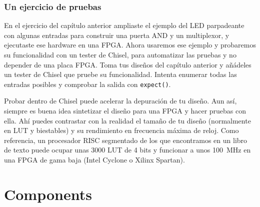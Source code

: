 \documentclass[%
    10pt,
    headinclude, footinclude=false,
    openright, %
    notitlepage,
    cleardoublepage=empty,
    headsepline,
    numbers=noenddot,
    bibliography=totoc, index=totoc,
    ]{scrbook}
\newcommand{\code}[1]{{\lstinline[basicstyle=\small\ttfamily]{#1}}}
\begin{document}
\subsection{Un ejercicio de pruebas}


En el ejercicio del capítulo anterior ampliaste el ejemplo del LED parpadeante con algunas entradas
para construir una puerta AND y un multiplexor, y ejecutaste ese hardware en una FPGA.
Ahora usaremos ese ejemplo y probaremos su funcionalidad con un tester de Chisel,
para automatizar las pruebas y no depender de una placa FPGA.
Toma tus diseños del capítulo anterior y añádeles un tester de Chisel que pruebe su funcionalidad.
Intenta enumerar todas las entradas posibles y comprobar la salida con \code{expect()}.


Probar dentro de Chisel puede acelerar la depuración de tu diseño.
Aun así, siempre es buena idea sintetizar el diseño para una FPGA y hacer pruebas
con ella. Ahí puedes contrastar con la realidad el tamaño de tu diseño (normalmente
en LUT y biestables) y su rendimiento en frecuencia máxima de reloj.
Como referencia, un procesador RISC segmentado de los que encontramos en un libro de texto puede 
ocupar unas 3000 LUT de 4 bits y funcionar a unos 100~MHz en una FPGA de gama baja (Intel Cyclone o
Xilinx Spartan).

\chapter{Components}
\end{document}
